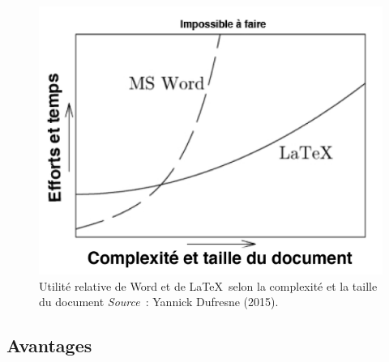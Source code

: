 \documentclass[
  letterpaper,
]{scrbook}
\begin{document}
\begin{figure}

{\centering \includegraphics{images/chapitre5_word-vs-latex.png}

}

\caption{\label{fig-latex-vs-word}Utilité relative de Word et de
\LaTeX~selon la complexité et la taille du document
\newline \textit{Source}~: Yannick Dufresne (2015).}

\end{figure}

\hypertarget{avantages}{%
\subsection{Avantages}\label{avantages}}
\end{document}
